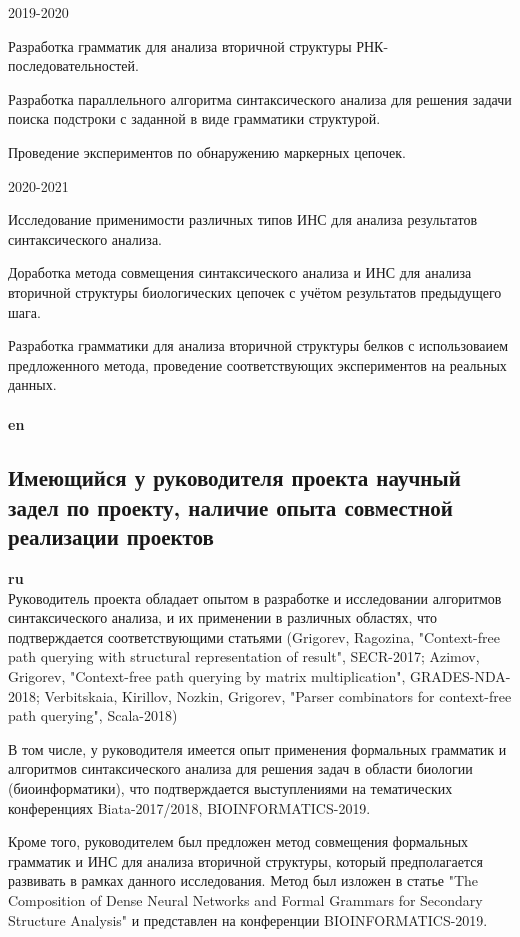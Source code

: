 \documentclass[12pt]{article}  %
\theoremstyle{remark}
\begin{document}
2019-2020

Разработка грамматик для анализа вторичной структуры РНК-последовательностей.

Разработка параллельного алгоритма синтаксического анализа для решения задачи поиска подстроки с заданной в виде грамматики структурой.

Проведение экспериментов по обнаружению маркерных цепочек.

2020-2021

Исследование применимости различных типов ИНС для анализа результатов синтаксического анализа.

Доработка метода совмещения синтаксического анализа и ИНС для анализа вторичной структуры биологических цепочек с учётом результатов предыдущего шага.

Разработка грамматики для анализа вторичной структуры белков с использоваием предложенного метода, проведение соответствующих экспериментов на реальных данных.
\\
\\
\textbf{en}\\


\subsection{Имеющийся у руководителя проекта научный задел по проекту, наличие опыта совместной реализации проектов}

\textbf{ru}\\
Руководитель проекта обладает опытом в разработке и исследовании алгоритмов синтаксического анализа, и их применении в различных областях, что подтверждается соответствующими статьями (Grigorev, Ragozina, "Context-free path querying with structural representation of result", SECR-2017; Azimov, Grigorev, "Context-free path querying by matrix multiplication", GRADES-NDA-2018; Verbitskaia, Kirillov, Nozkin, Grigorev, "Parser combinators for context-free path querying", Scala-2018)

В том числе, у руководителя имеется опыт применения формальных грамматик и алгоритмов синтаксического анализа для решения задач в области биологии (биоинформатики), что подтверждается выступлениями на тематических конференциях Biata-2017/2018, BIOINFORMATICS-2019.

Кроме того, руководителем был предложен метод совмещения формальных грамматик и ИНС для анализа вторичной структуры, который предполагается развивать в рамках данного исследования. Метод был изложен в статье "The Composition of Dense Neural Networks and Formal Grammars for Secondary Structure Analysis" и представлен на конференции BIOINFORMATICS-2019.
\end{document}
